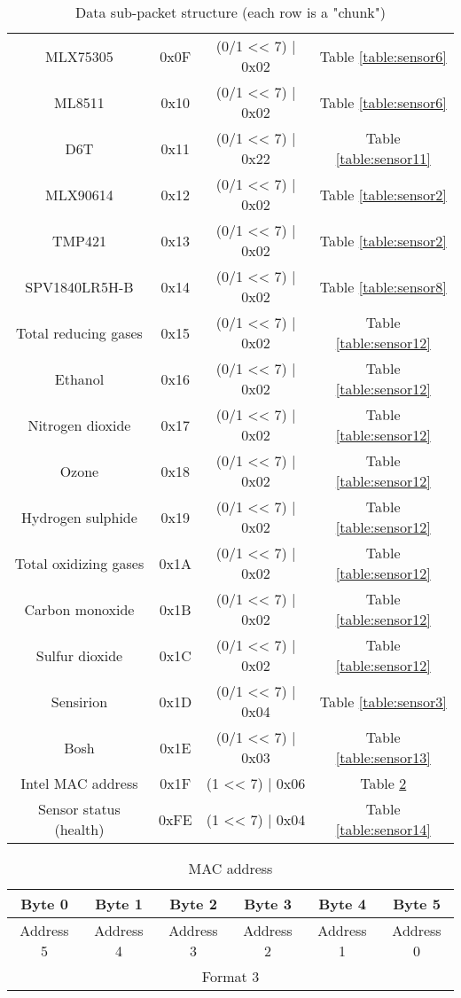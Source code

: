 \begin{table}[H]
{\begin{tabular}{|c c c c|}
        MLX75305 & 0x0F & (0/1 << 7) | 0x02 & Table \ref{table:sensor6}\\
        ML8511 & 0x10 & (0/1 << 7) | 0x02 & Table \ref{table:sensor6}\\
        D6T & 0x11 & (0/1 << 7) | 0x22 & Table \ref{table:sensor11}\\
        MLX90614 & 0x12 & (0/1 << 7) | 0x02 & Table \ref{table:sensor2}\\
        TMP421 & 0x13 & (0/1 << 7) | 0x02 & Table \ref{table:sensor2}\\
        SPV1840LR5H-B & 0x14 & (0/1 << 7) | 0x02 & Table \ref{table:sensor8}\\
        Total reducing gases & 0x15 & (0/1 << 7) | 0x02 & Table \ref{table:sensor12}\\
        Ethanol & 0x16 & (0/1 << 7) | 0x02 & Table \ref{table:sensor12}\\
        Nitrogen dioxide & 0x17 & (0/1 << 7) | 0x02 & Table \ref{table:sensor12}\\
        Ozone & 0x18 & (0/1 << 7) | 0x02 & Table \ref{table:sensor12}\\
        Hydrogen sulphide & 0x19 & (0/1 << 7) | 0x02 & Table \ref{table:sensor12}\\
        Total oxidizing gases & 0x1A & (0/1 << 7) | 0x02 & Table \ref{table:sensor12}\\
        Carbon monoxide & 0x1B & (0/1 << 7) | 0x02 & Table \ref{table:sensor12}\\
        Sulfur dioxide & 0x1C & (0/1 << 7) | 0x02 & Table \ref{table:sensor12}\\
        Sensirion & 0x1D & (0/1 << 7) | 0x04 & Table \ref{table:sensor3}\\
        Bosh & 0x1E & (0/1 << 7) | 0x03 & Table \ref{table:sensor13}\\
        Intel MAC address & 0x1F & (1 << 7) | 0x06 & Table \ref{table:sensor1}\\
        Sensor status (health) & 0xFE & (1 << 7) | 0x04 & Table \ref{table:sensor14}\\
        \hline
    \end{tabular}
    }
    \caption{Data sub-packet structure (each row is a "chunk")}
    \label{table:dataChunk}
\end{table}

\begin{table}[H]
    \centering
    {
    \begin{tabular}{|c c c c c c|}
        \hline
        \textbf{Byte 0} & \textbf{Byte 1} & \textbf{Byte 2} & \textbf{Byte 3} & \textbf{Byte 4} & \textbf{Byte 5}\\
        \hline
        \hline
        Address 5 & Address 4 & Address 3 & Address 2 & Address 1 & Address 0\\
        \multicolumn{6}{|c|}{Format 3}\\
        \hline
    \end{tabular}
    }
    \caption{MAC address}
    \label{table:sensor1}
\end{table}

